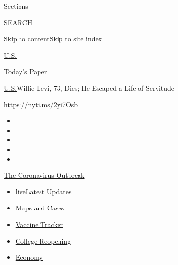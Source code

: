 Sections

SEARCH

\protect\hyperlink{site-content}{Skip to
content}\protect\hyperlink{site-index}{Skip to site index}

\href{https://www.nytimes.com/section/us}{U.S.}

\href{https://myaccount.nytimes.com/auth/login?response_type=cookie\&client_id=vi}{}

\href{https://www.nytimes.com/section/todayspaper}{Today's Paper}

\href{/section/us}{U.S.}\textbar{}Willie Levi, 73, Dies; He Escaped a
Life of Servitude

\url{https://nyti.ms/2yi7Osb}

\begin{itemize}
\item
\item
\item
\item
\item
\end{itemize}

\href{https://www.nytimes.com/news-event/coronavirus?action=click\&pgtype=Article\&state=default\&region=TOP_BANNER\&context=storylines_menu}{The
Coronavirus Outbreak}

\begin{itemize}
\tightlist
\item
  live\href{https://www.nytimes.com/2020/08/03/world/coronavirus-covid-19.html?action=click\&pgtype=Article\&state=default\&region=TOP_BANNER\&context=storylines_menu}{Latest
  Updates}
\item
  \href{https://www.nytimes.com/interactive/2020/us/coronavirus-us-cases.html?action=click\&pgtype=Article\&state=default\&region=TOP_BANNER\&context=storylines_menu}{Maps
  and Cases}
\item
  \href{https://www.nytimes.com/interactive/2020/science/coronavirus-vaccine-tracker.html?action=click\&pgtype=Article\&state=default\&region=TOP_BANNER\&context=storylines_menu}{Vaccine
  Tracker}
\item
  \href{https://www.nytimes.com/2020/08/02/us/covid-college-reopening.html?action=click\&pgtype=Article\&state=default\&region=TOP_BANNER\&context=storylines_menu}{College
  Reopening}
\item
  \href{https://www.nytimes.com/live/2020/08/03/business/stock-market-today-coronavirus?action=click\&pgtype=Article\&state=default\&region=TOP_BANNER\&context=storylines_menu}{Economy}
\end{itemize}

